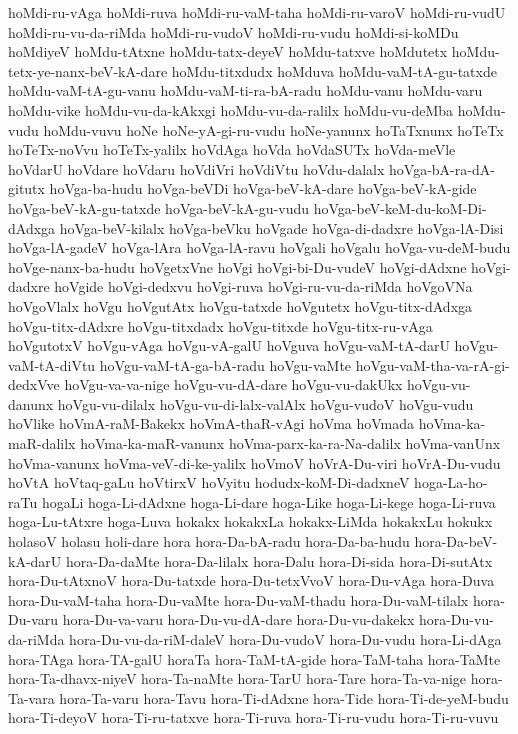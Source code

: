 {hoMdi-ru-vAga
hoMdi-ruva
hoMdi-ru-vaM-taha
hoMdi-ru-varoV
hoMdi-ru-vudU
hoMdi-ru-vu-da-riMda
hoMdi-ru-vudoV
hoMdi-ru-vudu
hoMdi-si-koMDu
hoMdiyeV
hoMdu-tAtxne
hoMdu-tatx-deyeV
hoMdu-tatxve
hoMdutetx
hoMdu-tetx-ye-nanx-beV-kA-dare
hoMdu-titxdudx
hoMduva
hoMdu-vaM-tA-gu-tatxde
hoMdu-vaM-tA-gu-vanu
hoMdu-vaM-ti-ra-bA-radu
hoMdu-vanu
hoMdu-varu
hoMdu-vike
hoMdu-vu-da-kAkxgi
hoMdu-vu-da-ralilx
hoMdu-vu-deMba
hoMdu-vudu
hoMdu-vuvu
hoNe
hoNe-yA-gi-ru-vudu
hoNe-yanunx
hoTaTxnunx
hoTeTx
hoTeTx-noVvu
hoTeTx-yalilx
hoVdAga
hoVda
hoVdaSUTx
hoVda-meVle
hoVdarU
hoVdare
hoVdaru
hoVdiVri
hoVdiVtu
hoVdu-dalalx
hoVga-bA-ra-dA-gitutx
hoVga-ba-hudu
hoVga-beVDi
hoVga-beV-kA-dare
hoVga-beV-kA-gide
hoVga-beV-kA-gu-tatxde
hoVga-beV-kA-gu-vudu
hoVga-beV-keM-du-koM-Di-dAdxga
hoVga-beV-kilalx
hoVga-beVku
hoVgade
hoVga-di-dadxre
hoVga-lA-Disi
hoVga-lA-gadeV
hoVga-lAra
hoVga-lA-ravu
hoVgali
hoVgalu
hoVga-vu-deM-budu
hoVge-nanx-ba-hudu
hoVgetxVne
hoVgi
hoVgi-bi-Du-vudeV
hoVgi-dAdxne
hoVgi-dadxre
hoVgide
hoVgi-dedxvu
hoVgi-ruva
hoVgi-ru-vu-da-riMda
hoVgoVNa
hoVgoVlalx
hoVgu
hoVgutAtx
hoVgu-tatxde
hoVgutetx
hoVgu-titx-dAdxga
hoVgu-titx-dAdxre
hoVgu-titxdadx
hoVgu-titxde
hoVgu-titx-ru-vAga
hoVgutotxV
hoVgu-vAga
hoVgu-vA-galU
hoVguva
hoVgu-vaM-tA-darU
hoVgu-vaM-tA-diVtu
hoVgu-vaM-tA-ga-bA-radu
hoVgu-vaMte
hoVgu-vaM-tha-va-rA-gi-dedxVve
hoVgu-va-va-nige
hoVgu-vu-dA-dare
hoVgu-vu-dakUkx
hoVgu-vu-danunx
hoVgu-vu-dilalx
hoVgu-vu-di-lalx-valAlx
hoVgu-vudoV
hoVgu-vudu
hoVlike
hoVmA-raM-Bakekx
hoVmA-thaR-vAgi
hoVma
hoVmada
hoVma-ka-maR-dalilx
hoVma-ka-maR-vanunx
hoVma-parx-ka-ra-Na-dalilx
hoVma-vanUnx
hoVma-vanunx
hoVma-veV-di-ke-yalilx
hoVmoV
hoVrA-Du-viri
hoVrA-Du-vudu
hoVtA
hoVtaq-gaLu
hoVtirxV
hoVyitu
hodudx-koM-Di-dadxneV
hoga-La-ho-raTu
hogaLi
hoga-Li-dAdxne
hoga-Li-dare
hoga-Like
hoga-Li-kege
hoga-Li-ruva
hoga-Lu-tAtxre
hoga-Luva
hokakx
hokakxLa
hokakx-LiMda
hokakxLu
hokukx
holasoV
holasu
holi-dare
hora
hora-Da-bA-radu
hora-Da-ba-hudu
hora-Da-beV-kA-darU
hora-Da-daMte
hora-Da-lilalx
hora-Dalu
hora-Di-sida
hora-Di-sutAtx
hora-Du-tAtxnoV
hora-Du-tatxde
hora-Du-tetxVvoV
hora-Du-vAga
hora-Duva
hora-Du-vaM-taha
hora-Du-vaMte
hora-Du-vaM-thadu
hora-Du-vaM-tilalx
hora-Du-varu
hora-Du-va-varu
hora-Du-vu-dA-dare
hora-Du-vu-dakekx
hora-Du-vu-da-riMda
hora-Du-vu-da-riM-daleV
hora-Du-vudoV
hora-Du-vudu
hora-Li-dAga
hora-TAga
hora-TA-galU
horaTa
hora-TaM-tA-gide
hora-TaM-taha
hora-TaMte
hora-Ta-dhavx-niyeV
hora-Ta-naMte
hora-TarU
hora-Tare
hora-Ta-va-nige
hora-Ta-vara
hora-Ta-varu
hora-Tavu
hora-Ti-dAdxne
hora-Tide
hora-Ti-de-yeM-budu
hora-Ti-deyoV
hora-Ti-ru-tatxve
hora-Ti-ruva
hora-Ti-ru-vudu
hora-Ti-ru-vuvu
}
